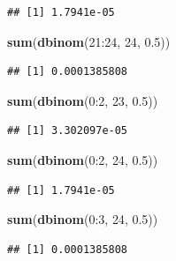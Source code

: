 \documentclass[]{tufte-book}
\newenvironment{Shaded}{}{}
\newcommand{\DecValTok}[1]{\textcolor[rgb]{0.25,0.63,0.44}{#1}}
\newcommand{\FloatTok}[1]{\textcolor[rgb]{0.25,0.63,0.44}{#1}}
\newcommand{\KeywordTok}[1]{\textcolor[rgb]{0.00,0.44,0.13}{\textbf{#1}}}
\newcommand{\NormalTok}[1]{#1}
\newcommand{\OperatorTok}[1]{\textcolor[rgb]{0.40,0.40,0.40}{#1}}
\theoremstyle{definition}
\theoremstyle{definition}
\theoremstyle{definition}
\theoremstyle{remark}
\begin{document}
\begin{verbatim}
## [1] 1.7941e-05
\end{verbatim}

\begin{Shaded}
\begin{Highlighting}[]
\KeywordTok{sum}\NormalTok{(}\KeywordTok{dbinom}\NormalTok{(}\DecValTok{21}\OperatorTok{:}\DecValTok{24}\NormalTok{, }\DecValTok{24}\NormalTok{, }\FloatTok{0.5}\NormalTok{))}
\end{Highlighting}
\end{Shaded}

\begin{verbatim}
## [1] 0.0001385808
\end{verbatim}

\begin{Shaded}
\begin{Highlighting}[]
\KeywordTok{sum}\NormalTok{(}\KeywordTok{dbinom}\NormalTok{(}\DecValTok{0}\OperatorTok{:}\DecValTok{2}\NormalTok{, }\DecValTok{23}\NormalTok{, }\FloatTok{0.5}\NormalTok{))}
\end{Highlighting}
\end{Shaded}

\begin{verbatim}
## [1] 3.302097e-05
\end{verbatim}

\begin{Shaded}
\begin{Highlighting}[]
\KeywordTok{sum}\NormalTok{(}\KeywordTok{dbinom}\NormalTok{(}\DecValTok{0}\OperatorTok{:}\DecValTok{2}\NormalTok{, }\DecValTok{24}\NormalTok{, }\FloatTok{0.5}\NormalTok{))}
\end{Highlighting}
\end{Shaded}

\begin{verbatim}
## [1] 1.7941e-05
\end{verbatim}

\begin{Shaded}
\begin{Highlighting}[]
\KeywordTok{sum}\NormalTok{(}\KeywordTok{dbinom}\NormalTok{(}\DecValTok{0}\OperatorTok{:}\DecValTok{3}\NormalTok{, }\DecValTok{24}\NormalTok{, }\FloatTok{0.5}\NormalTok{))}
\end{Highlighting}
\end{Shaded}

\begin{verbatim}
## [1] 0.0001385808
\end{verbatim}
\end{document}

